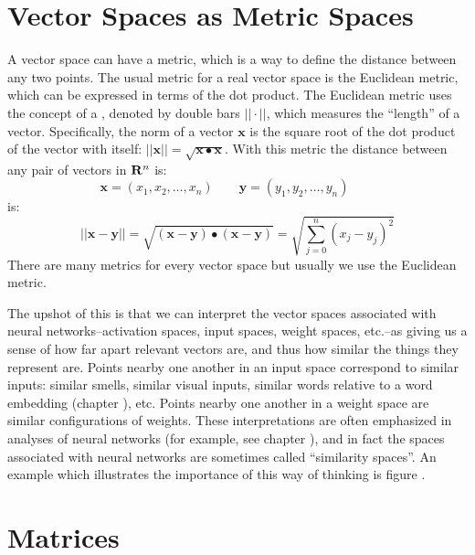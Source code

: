 \section{Vector Spaces as Metric Spaces}\label{metricSpace}


A vector space can have a metric, which is a way to define the distance between any two points. The usual metric for a real vector space is the Euclidean metric, which can be expressed in terms of the dot product. The Euclidean metric uses the concept of a , denoted by double bars $|| \cdot ||$, which measures the ``length'' of a vector. Specifically, the norm of a vector $\mathbf{x}$ is the square root of the dot product of the vector with itself: $||\mathbf{x}|| = \sqrt{\mathbf{x} \bullet \mathbf{x}}$.  With this
metric the distance between any pair of vectors in ${\bf R}^n$ is:
\begin{equation*}
\mathbf{x} = (x_1, x_2, \ldots, x_n) \qquad
\mathbf{y} = (y_1, y_2, \ldots, y_n) \qquad
\end{equation*}
is:
\begin{equation*}
|| \mathbf{x} - \mathbf{y} || =
\sqrt{ (\mathbf{x} - \mathbf{y}) \bullet (\mathbf{x} - \mathbf{y}) }
= \sqrt{ \sum_{j=0}^n (x_j - y_j)^2 }
\end{equation*}
There are many metrics for every vector space but usually we use the Euclidean metric.

The upshot of this is that we can interpret the vector spaces associated with neural networks--activation spaces, input spaces, weight spaces, etc.--as giving us a sense of how far apart relevant vectors are, and thus how similar the things they represent are. Points nearby one another in an input space correspond to similar inputs: similar smells, similar visual inputs, similar words relative to a word embedding (chapter ), etc. Points nearby one another in a weight space are similar configurations of weights. These interpretations are often emphasized in analyses of neural networks (for example, see chapter ), and in fact the spaces associated with neural networks are sometimes called ``similarity spaces''.  An example which illustrates the importance of this way of thinking is figure .

\section{Matrices}\label{sect_matrices}

